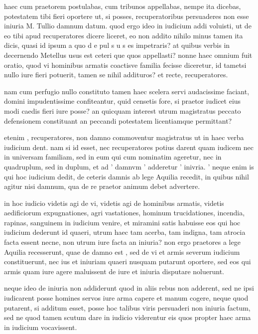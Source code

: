  haec cum praetorem postulabas, cum tribunos appellabas, nempe ita dicebas, potestatem tibi fieri oportere ut, si posses, recuperatoribus persuaderes non esse iniuria M. Tullio damnum datum. quod ergo ideo in iudicium addi voluisti, ut de eo tibi apud recuperatores dicere liceret, eo non addito nihilo minus tamen ita dicis, quasi id ipsum a quo d e pul s u s es impetraris? at quibus verbis in decernendo Metellus usus est ceteri que quos appellasti? nonne haec omnium fuit oratio, quod vi hominibus armatis coactisve familia fecisse diceretur, id tametsi nullo iure fieri potuerit, tamen se nihil addituros? et recte, recuperatores.

 nam cum perfugio nullo constituto tamen haec scelera servi audacissime faciant, domini impudentissime confiteantur, quid censetis fore, si praetor iudicet eius modi caedis fieri iure posse? an quicquam interest utrum magistratus peccato defensionem constituant an peccandi potestatem licentiamque permittant?

 etenim , recuperatores, non damno commoventur magistratus ut in haec verba iudicium dent. nam si id esset, nec recuperatores potius darent quam iudicem nec in universam familiam, sed in eum qui cum nominatim ageretur, nec in quadruplum, sed in duplum, et ad ' damnvm ' adderetur ' inivria. ' neque enim is qui hoc iudicium dedit, de ceteris damnis ab lege Aquilia recedit, in quibus nihil agitur nisi damnum, qua de re praetor animum debet advertere.

 in hoc iudicio videtis agi de vi, videtis agi de hominibus armatis, videtis aedificiorum expugnationes, agri vastationes, hominum trucidationes, incendia, rapinas, sanguinem in iudicium venire, et miramini satis habuisse eos qui hoc iudicium dederunt id quaeri, utrum haec tam acerba, tam indigna, tam atrocia facta essent necne, non utrum iure facta an iniuria? non ergo praetores a lege Aquilia recesserunt, quae de damno est , sed de vi et armis severum iudicium constituerunt, nec ius et iniuriam quaeri nusquam putarunt oportere, sed eos qui armis quam iure agere maluissent de iure et iniuria disputare noluerunt.

 neque ideo de iniuria non addiderunt quod in aliis rebus non adderent, sed ne ipsi iudicarent posse homines servos iure arma capere et manum cogere, neque quod putarent, si additum esset, posse hoc talibus viris persuaderi non iniuria factum, sed ne quod tamen scutum dare in iudicio viderentur eis quos propter haec arma in iudicium vocavissent.

